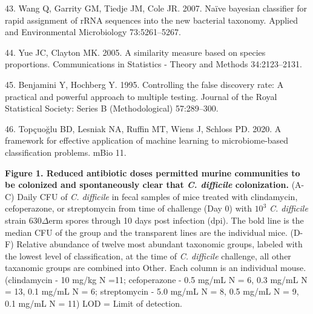 \documentclass[12pt,]{article}
\newlength{\cslhangindent}
\newenvironment{cslreferences}%
  {\setlength{\parindent}{0pt}%
  \everypar{\setlength{\hangindent}{\cslhangindent}}\ignorespaces}%
  {\par}
\begin{document}
\begin{cslreferences}
\leavevmode\hypertarget{ref-wang2007}{}%
43. Wang Q, Garrity GM, Tiedje JM, Cole JR. 2007. Naïve bayesian
classifier for rapid assignment of rRNA sequences into the new bacterial
taxonomy. Applied and Environmental Microbiology 73:5261--5267.

\leavevmode\hypertarget{ref-yue2005}{}%
44. Yue JC, Clayton MK. 2005. A similarity measure based on species
proportions. Communications in Statistics - Theory and Methods
34:2123--2131.

\leavevmode\hypertarget{ref-benjamini1995}{}%
45. Benjamini Y, Hochberg Y. 1995. Controlling the false discovery rate:
A practical and powerful approach to multiple testing. Journal of the
Royal Statistical Society: Series B (Methodological) 57:289--300.

\leavevmode\hypertarget{ref-topcuoglu2020}{}%
46. Topçuoğlu BD, Lesniak NA, Ruffin MT, Wiens J, Schloss PD. 2020. A
framework for effective application of machine learning to
microbiome-based classification problems. mBio 11.
\end{cslreferences}

\newpage

\textbf{Figure 1. Reduced antibiotic doses permitted murine communities
to be colonized and spontaneously clear that \emph{C. difficile}
colonization.} (A-C) Daily CFU of \emph{C. difficile} in fecal samples
of mice treated with clindamycin, cefoperazone, or streptomycin from
time of challenge (Day 0) with \(10^{3}\) \emph{C. difficile} strain
630\(\Delta\)erm spores through 10 days post infection (dpi). The bold
line is the median CFU of the group and the transparent lines are the
individual mice. (D-F) Relative abundance of twelve most abundant
taxonomic groups, labeled with the lowest level of classification, at
the time of \emph{C. difficile} challenge, all other taxanomic groups
are combined into Other. Each column is an individual mouse.
(clindamycin - 10 mg/kg N =11; cefoperazone - 0.5 mg/mL N = 6, 0.3 mg/mL
N = 13, 0.1 mg/mL N = 6; streptomycin - 5.0 mg/mL N = 8, 0.5 mg/mL N =
9, 0.1 mg/mL N = 11) LOD = Limit of detection.

\hfill\break
\end{document}
